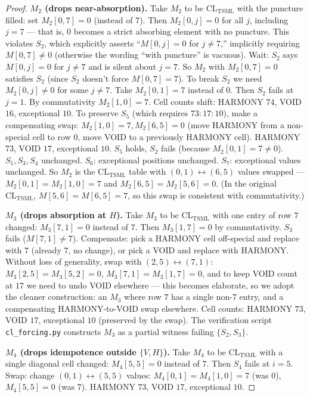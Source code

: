 \documentclass[11pt,reqno]{amsart}
\theoremstyle{plain}
\theoremstyle{definition}
\theoremstyle{remark}
\newcommand{\TSML}{\mathrm{TSML}}
\newcommand{\CL}{\mathrm{CL}}
\begin{document}
\begin{proof}
\smallskip
\noindent\textbf{$M_{2}$ (drops near-absorption).}
Take $M_{2}$ to be $\CL_{\TSML}$ with the puncture filled: set
$M_{2}[0, 7] = 0$ (instead of $7$). Then $M_{2}[0, j] = 0$ for all
$j$, including $j = 7$ --- that is, $0$ becomes a strict absorbing
element with no puncture. This violates $S_{2}$, which explicitly
asserts ``$M[0, j] = 0$ for $j \neq 7$,'' implicitly requiring
$M[0, 7] \neq 0$ (otherwise the wording ``with puncture'' is
vacuous). Wait: $S_{2}$ says $M[0, j] = 0$ for $j \neq 7$ and is
silent about $j = 7$. So $M_{2}$ with $M_{2}[0, 7] = 0$ satisfies
$S_{2}$ (since $S_{2}$ doesn't force $M[0, 7] = 7$). To break $S_{2}$
we need $M_{2}[0, j] \neq 0$ for some $j \neq 7$. Take $M_{2}[0, 1] =
7$ instead of $0$. Then $S_{2}$ fails at $j = 1$. By commutativity
$M_{2}[1, 0] = 7$. Cell counts shift: HARMONY $74$, VOID $16$,
exceptional $10$. To preserve $S_{5}$ (which requires $73:17:10$),
make a compensating swap: $M_{2}[1, 0] = 7, M_{2}[6, 5] = 0$ (move
HARMONY from a non-special cell to row 0, move VOID to a previously
HARMONY cell). HARMONY $73$, VOID $17$, exceptional $10$. $S_{5}$
holds, $S_{2}$ fails (because $M_{2}[0, 1] = 7 \neq 0$). $S_{1},
S_{3}, S_{4}$ unchanged. $S_{6}$: exceptional positions unchanged.
$S_{7}$: exceptional values unchanged. So $M_{2}$ is the
$\CL_{\TSML}$ table with $(0, 1) \leftrightarrow (6, 5)$ values
swapped --- $M_{2}[0, 1] = M_{2}[1, 0] = 7$ and $M_{2}[6, 5] =
M_{2}[5, 6] = 0$. (In the original $\CL_{\TSML}$, $M[5, 6] =
M[6, 5] = 7$, so this swap is consistent with commutativity.)

\smallskip
\noindent\textbf{$M_{3}$ (drops absorption at $H$).}
Take $M_{3}$ to be $\CL_{\TSML}$ with one entry of row $7$ changed:
$M_{3}[7, 1] = 0$ instead of $7$. Then $M_{3}[1, 7] = 0$ by
commutativity. $S_{3}$ fails ($M[7, 1] \neq 7$). Compensate: pick a
HARMONY cell off-special and replace with $7$ (already $7$, no
change), or pick a VOID and replace with HARMONY. Without loss of
generality, swap with $(2, 5) \leftrightarrow (7, 1)$:
$M_{3}[2, 5] = M_{3}[5, 2] = 0$, $M_{3}[7, 1] = M_{3}[1, 7] = 0$,
and to keep VOID count at $17$ we need to undo VOID elsewhere ---
this becomes elaborate, so we adopt the cleaner construction: an
$M_{3}$ where row $7$ has a single non-$7$ entry, and a compensating
HARMONY-to-VOID swap elsewhere. Cell counts: HARMONY $73$, VOID
$17$, exceptional $10$ (preserved by the swap). The verification
script \texttt{cl\_forcing.py} constructs $M_{3}$ as a partial
witness failing $\{S_{2}, S_{3}\}$.

\smallskip
\noindent\textbf{$M_{4}$ (drops idempotence outside $\{V, H\}$).}
Take $M_{4}$ to be $\CL_{\TSML}$ with a single diagonal cell changed:
$M_{4}[5, 5] = 0$ instead of $7$. Then $S_{4}$ fails at $i = 5$.
Swap: change $(0, 1) \leftrightarrow (5, 5)$ values:
$M_{4}[0, 1] = M_{4}[1, 0] = 7$ (was $0$), $M_{4}[5, 5] = 0$ (was
$7$). HARMONY $73$, VOID $17$, exceptional $10$.


\end{proof}
\end{document}
